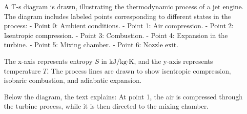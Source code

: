 A T-s diagram is drawn, illustrating the thermodynamic process of a jet engine. The diagram includes labeled points corresponding to different states in the process:  
- Point 0: Ambient conditions.  
- Point 1: Air compression.  
- Point 2: Isentropic compression.  
- Point 3: Combustion.  
- Point 4: Expansion in the turbine.  
- Point 5: Mixing chamber.  
- Point 6: Nozzle exit.  

The x-axis represents entropy \( S \) in \( \text{kJ/kg·K} \), and the y-axis represents temperature \( T \). The process lines are drawn to show isentropic compression, isobaric combustion, and adiabatic expansion.  

Below the diagram, the text explains:  
At point 1, the air is compressed through the turbine process, while it is then directed to the mixing chamber.